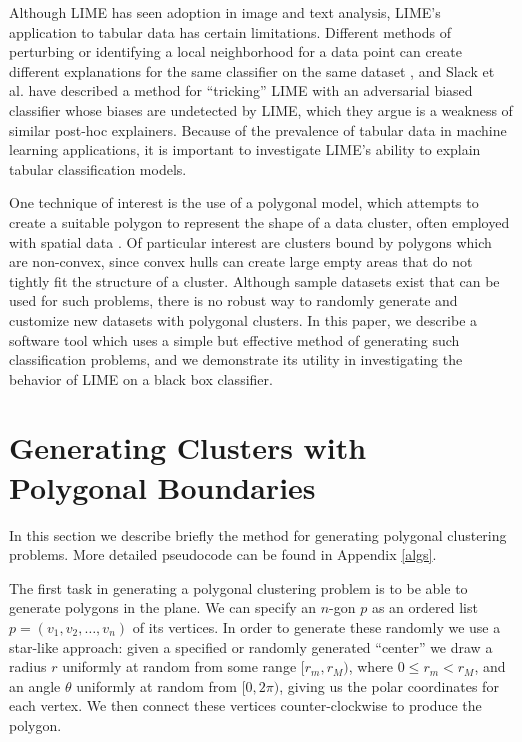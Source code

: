 \documentclass[manuscript,screen,review]{acmart}
\begin{document}
Although LIME has seen adoption in image and text analysis, LIME's application to tabular data
has certain limitations. Different methods of perturbing or identifying a local neighborhood for a data point
can create different explanations for the same classifier on the same dataset \cite{expma}, and Slack et al. 
\cite{fooling} have described a method for ``tricking'' LIME with an adversarial biased classifier whose biases
are undetected by LIME, which they argue is a weakness of similar post-hoc explainers. Because of the prevalence of
tabular data in machine learning applications, it is important to investigate LIME's ability to explain tabular
classification models.

One technique of interest is the use of a polygonal model, which attempts to create a suitable
polygon to represent the shape of a data cluster, often employed with spatial data \cite{polygon-mining}. Of particular 
interest are clusters bound by polygons which are non-convex, since convex hulls can create large empty areas that do 
not tightly fit the structure of a cluster. Although sample datasets exist that can be used for such problems, there is no 
robust way to randomly generate and customize new datasets with polygonal clusters. In this paper, we describe a software tool which uses a simple but effective method of generating such classification problems, and we demonstrate its utility in investigating the behavior of LIME on a black box classifier.

\section{Generating Clusters with Polygonal Boundaries}

In this section we describe briefly the method for generating polygonal clustering problems. More detailed pseudocode
can be found in Appendix \ref{algs}.

The first task in generating a polygonal clustering problem is to be able to generate polygons in the plane.
We can specify an $n$-gon $p$ as an ordered list $p = (v_1, v_2, \dots, v_n)$ of its vertices. In order to
generate these randomly we use a star-like approach: given a specified or randomly generated ``center'' we draw
a radius $r$ uniformly at random from some range $[r_m, r_M)$, where $0 \leq r_m < r_M$,
and an angle $\theta$ uniformly at random from $[0, 2\pi)$, giving us the polar coordinates for each vertex.
We then connect these vertices counter-clockwise to produce the polygon.
\end{document}
